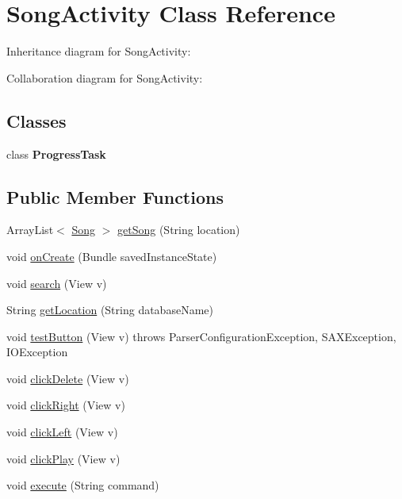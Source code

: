 \hypertarget{classcom_1_1axcoto_1_1shinjuku_1_1sushi_1_1_song_activity}{\section{\-Song\-Activity \-Class \-Reference}
\label{classcom_1_1axcoto_1_1shinjuku_1_1sushi_1_1_song_activity}
}


\-Inheritance diagram for \-Song\-Activity\-:


\-Collaboration diagram for \-Song\-Activity\-:
\subsection*{\-Classes}
\begin{DoxyCompactItemize}
\item 
class {\bfseries \-Progress\-Task}
\end{DoxyCompactItemize}
\subsection*{\-Public \-Member \-Functions}
\begin{DoxyCompactItemize}
\item 
\-Array\-List$<$ \hyperlink{classcom_1_1axcoto_1_1shinjuku_1_1maki_1_1_song}{\-Song} $>$ \hyperlink{classcom_1_1axcoto_1_1shinjuku_1_1sushi_1_1_song_activity_a46fbc7e00b20324d412780a529c329ba}{get\-Song} (\-String location)
\item 
void \hyperlink{classcom_1_1axcoto_1_1shinjuku_1_1sushi_1_1_song_activity_a85e87cb5ced88dff7c8173ecc4f636d1}{on\-Create} (\-Bundle saved\-Instance\-State)
\item 
void \hyperlink{classcom_1_1axcoto_1_1shinjuku_1_1sushi_1_1_song_activity_a1aa1b883783cb43cf1edc46b6821ae3a}{search} (\-View v)
\item 
\-String \hyperlink{classcom_1_1axcoto_1_1shinjuku_1_1sushi_1_1_song_activity_adc352de1c16a1ab6d8415362be00b420}{get\-Location} (\-String database\-Name)
\item 
void \hyperlink{classcom_1_1axcoto_1_1shinjuku_1_1sushi_1_1_song_activity_a5e1cf24681112b7e51bb2de4c2e09974}{test\-Button} (\-View v)  throws Parser\-Configuration\-Exception, S\-A\-X\-Exception, I\-O\-Exception     
\item 
void \hyperlink{classcom_1_1axcoto_1_1shinjuku_1_1sushi_1_1_song_activity_a7b40c94ef115f3717b11b488a191e534}{click\-Delete} (\-View v)
\item 
void \hyperlink{classcom_1_1axcoto_1_1shinjuku_1_1sushi_1_1_song_activity_a0d2c0dd2cd6a1ea71e6fd8a039e7eb3a}{click\-Right} (\-View v)
\item 
void \hyperlink{classcom_1_1axcoto_1_1shinjuku_1_1sushi_1_1_song_activity_a14e4ec7ba054afff05003e32ae68439c}{click\-Left} (\-View v)
\item 
void \hyperlink{classcom_1_1axcoto_1_1shinjuku_1_1sushi_1_1_song_activity_a2edeb21d087b402bb8b42d0b457932df}{click\-Play} (\-View v)
\item 
void \hyperlink{classcom_1_1axcoto_1_1shinjuku_1_1sushi_1_1_song_activity_a1d6ee937b4c42ba06093c71a06adac7b}{execute} (\-String command)
\end{DoxyCompactItemize}
